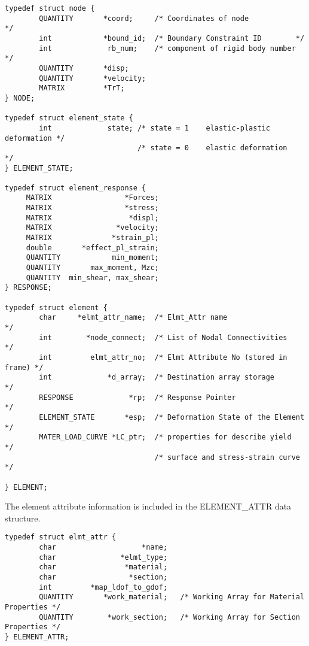 \begin{footnotesize}
\begin{verbatim}
typedef struct node {
        QUANTITY       *coord;     /* Coordinates of node            */
        int            *bound_id;  /* Boundary Constraint ID        */
        int             rb_num;    /* component of rigid body number */
        QUANTITY       *disp;
        QUANTITY       *velocity;
        MATRIX         *TrT;
} NODE;

typedef struct element_state {
        int             state; /* state = 1    elastic-plastic deformation */
                               /* state = 0    elastic deformation         */
} ELEMENT_STATE;

typedef struct element_response {
     MATRIX                 *Forces;
     MATRIX                 *stress;
     MATRIX                  *displ;
     MATRIX               *velocity;
     MATRIX              *strain_pl;
     double       *effect_pl_strain;
     QUANTITY            min_moment;
     QUANTITY       max_moment, Mzc;
     QUANTITY  min_shear, max_shear;
} RESPONSE;

typedef struct element {
        char     *elmt_attr_name;  /* Elmt_Attr name                      */
        int        *node_connect;  /* List of Nodal Connectivities        */
        int         elmt_attr_no;  /* Elmt Attribute No (stored in frame) */
        int             *d_array;  /* Destination array storage           */
        RESPONSE             *rp;  /* Response Pointer                    */
        ELEMENT_STATE       *esp;  /* Deformation State of the Element    */
        MATER_LOAD_CURVE *LC_ptr;  /* properties for describe yield       */
                                   /* surface and stress-strain curve     */

} ELEMENT;
\end{verbatim}
\end{footnotesize}

\vspace{0.05 in}\noindent
The element attribute information is included in the ELEMENT\_ATTR data structure.

\begin{footnotesize}
\begin{verbatim}
typedef struct elmt_attr {
        char                    *name;
        char               *elmt_type;
        char                *material;
        char                 *section;
        int         *map_ldof_to_gdof;
        QUANTITY       *work_material;   /* Working Array for Material Properties */
        QUANTITY        *work_section;   /* Working Array for Section  Properties */
} ELEMENT_ATTR;
\end{verbatim}
\end{footnotesize}


